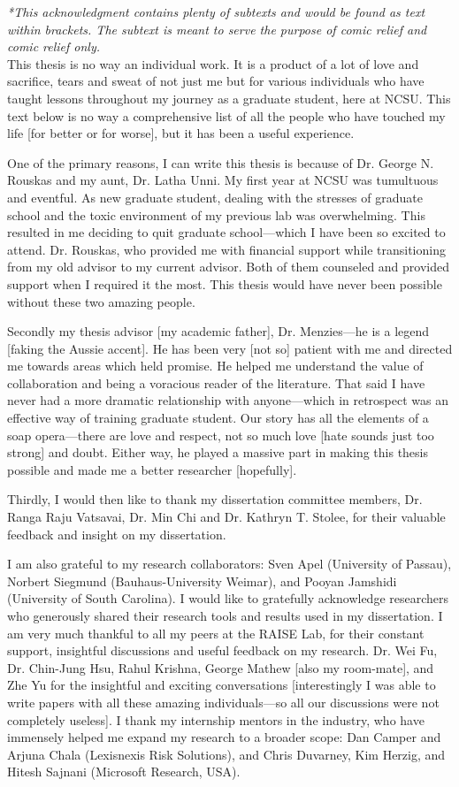 \textit{*This acknowledgment contains plenty of subtexts and would be found as text within brackets. The subtext is meant to serve the purpose of comic relief and comic relief only.} \\

This thesis is no way an individual work. It is a product of a lot of love and sacrifice, tears and sweat of not just me but for various individuals who have taught lessons throughout my journey as a graduate student, here at NCSU. This text below is no way a comprehensive list of all the people who have touched my life [for better or for worse], but it has been a useful experience. 

One of the primary reasons, I can write this thesis is because of Dr. George N. Rouskas and my aunt, Dr. Latha Unni. 
My first year at NCSU was tumultuous and eventful. As new graduate student, dealing with the stresses of graduate school and the toxic environment of my previous lab was overwhelming. This resulted in me deciding to quit graduate school---which I have been so excited to attend. Dr. Rouskas, who provided me with financial support while transitioning from my old advisor to my current advisor. Both of them counseled and provided support when I required it the most. This thesis would have never been possible without these two amazing people. 

Secondly my thesis advisor [my academic father], Dr. Menzies---he is a legend [faking the Aussie accent]. He has been very [not so] patient with me and directed me towards
areas which held promise. He helped me understand the value of collaboration and being a voracious reader of the literature. 
That said I have never had a more dramatic relationship with anyone---which in retrospect was an effective way of training graduate student. Our story has all the elements of a soap opera---there are love and respect,  not so much love [hate sounds just too strong] and doubt. Either way, he played a massive part in making this thesis possible and made me a better researcher [hopefully]. 

Thirdly, I would then like to thank my dissertation committee members,
Dr. Ranga Raju Vatsavai, Dr. Min Chi and Dr. Kathryn T. Stolee,
for their valuable feedback and insight on my dissertation.

I am also grateful to my research collaborators: Sven Apel (University of Passau), Norbert Siegmund (Bauhaus-University Weimar), and Pooyan Jamshidi (University of South Carolina).  I would like to gratefully acknowledge researchers who generously shared their research tools and results used in my dissertation.  I am very much
thankful to all my peers at the RAISE Lab, for their constant support, insightful discussions and useful feedback on
my research. Dr. Wei Fu, Dr. Chin-Jung Hsu, Rahul Krishna, George Mathew [also my room-mate], and Zhe Yu for the insightful and exciting conversations [interestingly I was able to write papers with all these amazing individuals---so all our discussions were not completely useless]. 
I thank my internship mentors in the industry, who have immensely helped me expand
my research to a broader scope: Dan Camper and Arjuna Chala (Lexisnexis Risk Solutions), and Chris Duvarney, Kim Herzig, and Hitesh Sajnani (Microsoft Research, USA). 



